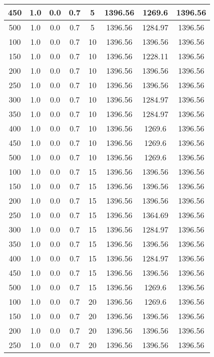 \documentclass[a4paper, 12pt]{extreport}
\begin{document}
\begin{itemize}
\begin{longtable}{|c|c|c|c|c|c|c|c|}
			450 & 1.0 & 0.0 & 0.7 & 5 & 1396.56 & 1269.6 & 1396.56 \\\hline
			500 & 1.0 & 0.0 & 0.7 & 5 & 1396.56 & 1284.97 & 1396.56 \\\hline
			100 & 1.0 & 0.0 & 0.7 & 10 & 1396.56 & 1396.56 & 1396.56 \\\hline
			150 & 1.0 & 0.0 & 0.7 & 10 & 1396.56 & 1228.11 & 1396.56 \\\hline
			200 & 1.0 & 0.0 & 0.7 & 10 & 1396.56 & 1396.56 & 1396.56 \\\hline
			250 & 1.0 & 0.0 & 0.7 & 10 & 1396.56 & 1396.56 & 1396.56 \\\hline
			300 & 1.0 & 0.0 & 0.7 & 10 & 1396.56 & 1284.97 & 1396.56 \\\hline
			350 & 1.0 & 0.0 & 0.7 & 10 & 1396.56 & 1284.97 & 1396.56 \\\hline
			400 & 1.0 & 0.0 & 0.7 & 10 & 1396.56 & 1269.6 & 1396.56 \\\hline
			450 & 1.0 & 0.0 & 0.7 & 10 & 1396.56 & 1269.6 & 1396.56 \\\hline
			500 & 1.0 & 0.0 & 0.7 & 10 & 1396.56 & 1269.6 & 1396.56 \\\hline
			100 & 1.0 & 0.0 & 0.7 & 15 & 1396.56 & 1396.56 & 1396.56 \\\hline
			150 & 1.0 & 0.0 & 0.7 & 15 & 1396.56 & 1396.56 & 1396.56 \\\hline
			200 & 1.0 & 0.0 & 0.7 & 15 & 1396.56 & 1396.56 & 1396.56 \\\hline
			250 & 1.0 & 0.0 & 0.7 & 15 & 1396.56 & 1364.69 & 1396.56 \\\hline
			300 & 1.0 & 0.0 & 0.7 & 15 & 1396.56 & 1284.97 & 1396.56 \\\hline
			350 & 1.0 & 0.0 & 0.7 & 15 & 1396.56 & 1396.56 & 1396.56 \\\hline
			400 & 1.0 & 0.0 & 0.7 & 15 & 1396.56 & 1284.97 & 1396.56 \\\hline
			450 & 1.0 & 0.0 & 0.7 & 15 & 1396.56 & 1396.56 & 1396.56 \\\hline
			500 & 1.0 & 0.0 & 0.7 & 15 & 1396.56 & 1269.6 & 1396.56 \\\hline
			100 & 1.0 & 0.0 & 0.7 & 20 & 1396.56 & 1269.6 & 1396.56 \\\hline
			150 & 1.0 & 0.0 & 0.7 & 20 & 1396.56 & 1396.56 & 1396.56 \\\hline
			200 & 1.0 & 0.0 & 0.7 & 20 & 1396.56 & 1396.56 & 1396.56 \\\hline
			250 & 1.0 & 0.0 & 0.7 & 20 & 1396.56 & 1396.56 & 1396.56 \\\hline

\end{longtable}
\end{itemize}
\end{document}
